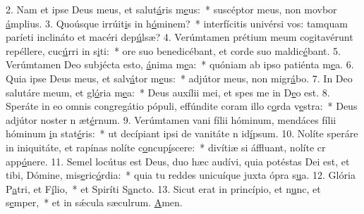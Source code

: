 2. Nam et ipse Deus meus, et salut\uline{á}ris m\uline{e}us:~* suscéptor meus, non movbor \uline{á}mplius.
3. Quoúsque irrúit\uline{i}s in h\uline{ó}minem?~* interfícitis univérsi vos: tamquam paríeti inclináto et macéri dep\uline{ú}lsæ?
4. Verúmtamen prétium meum cogitavérunt repéllere, cuc\uline{ú}rri in s\uline{i}ti:~* ore suo benedicébant, et corde suo maldic\uline{é}bant.
5. Verúmtamen Deo subjécta esto, \uline{á}nima m\uline{e}a:~* quóniam ab ipso patiénta m\uline{e}a.
6. Quia ipse Deus meus, et salv\uline{á}tor m\uline{e}us:~* adjútor meus, non migr\uline{á}bo.
7. In Deo salutáre meum, et gl\uline{ó}ria m\uline{e}a:~* Deus auxílii mei, et spes me in D\uline{e}o est.
8. Speráte in eo omnis congregátio pópuli, effúndite coram illo c\uline{o}rda v\uline{e}stra:~* Deus adjútor noster n æt\uline{é}rnum.
9. Verúmtamen vani fílii hóminum, mendáces fílii hóminum \uline{i}n stat\uline{é}ris:~* ut decípiant ipsi de vanitáte n id\uline{í}psum.
10. Nolíte speráre in iniquitáte, et rapínas nolíte c\uline{o}ncup\uline{í}scere:~* divítiæ si áffluant, nolíte cr app\uline{ó}nere.
11. Semel locútus est Deus, duo hæc audívi, quia potéstas Dei est, et tibi, Dómine, mis\uline{e}ric\uline{ó}rdia:~* quia tu reddes unicuíque juxta ópra s\uline{u}a.
12. Glória P\uline{a}tri, et F\uline{í}lio,~* et Spiríti S\uline{a}ncto.
13. Sicut erat in princípio, et n\uline{u}nc, et s\uline{e}mper,~* et in sǽcula sæculrum. \uline{A}men.
